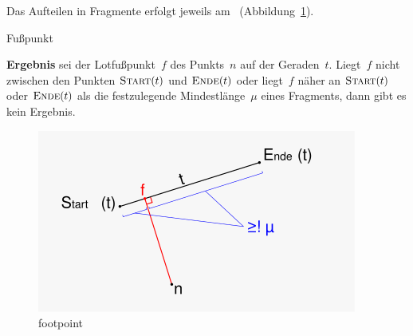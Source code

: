 \documentclass[../main/thesis.tex]{subfiles}
\begin{document}



\noindent
Das Aufteilen in Fragmente erfolgt jeweils am ~(Abbildung~\ref{fig:footpoint}).

\begin{algorithmhere}{Fußpunkt}
\label{alg:Fusspunkt}
\begin{algorithmic}
	\State \textbf{Ergebnis} sei der Lotfußpunkt~$f$ des Punkts~$n$ auf der Geraden~$t$. Liegt~$f$ nicht zwischen den Punkten $\textproc{Start}(t)$ und $\textproc{Ende}(t)$ oder liegt~$f$ näher an $\textproc{Start}(t)$ oder $\textproc{Ende}(t)$ als die festzulegende Mindestlänge~$\mu$ eines Fragments, dann gibt es kein Ergebnis.
\EndFunction
\end{algorithmic}
\end{algorithmhere}

\begin{figure}[H]
    \centering
    \includegraphics[width=\ScaleIfNeeded]{../chapter4/footpoint}
    \caption{footpoint}\label{fig:footpoint}
\end{figure}
\end{document}
